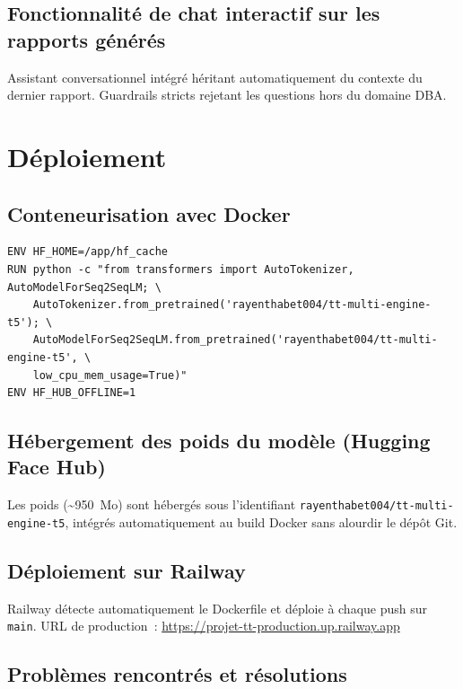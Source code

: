 \documentclass[12pt,a4paper]{report}
\begin{document}
\subsection{Fonctionnalit\'e de chat interactif sur les rapports g\'en\'er\'es}

Assistant conversationnel int\'egr\'e h\'eritant automatiquement du contexte du
dernier rapport. Guardrails stricts rejetant les questions hors du domaine DBA.

\section{D\'eploiement}

\subsection{Conteneurisation avec Docker}

\begin{lstlisting}[language={},caption={Extrait du Dockerfile --- pr\'e-t\'el\'echargement du mod\`ele},label=lst:dockerfile]
ENV HF_HOME=/app/hf_cache
RUN python -c "from transformers import AutoTokenizer, AutoModelForSeq2SeqLM; \
    AutoTokenizer.from_pretrained('rayenthabet004/tt-multi-engine-t5'); \
    AutoModelForSeq2SeqLM.from_pretrained('rayenthabet004/tt-multi-engine-t5', \
    low_cpu_mem_usage=True)"
ENV HF_HUB_OFFLINE=1
\end{lstlisting}

\subsection{H\'ebergement des poids du mod\`ele (Hugging Face Hub)}

Les poids (\textasciitilde{}950~Mo) sont h\'eberg\'es sous l'identifiant
\texttt{rayenthabet004/tt-multi-engine-t5}, int\'egr\'es automatiquement au build
Docker sans alourdir le d\'ep\^ot Git.

\subsection{D\'eploiement sur Railway}

Railway d\'etecte automatiquement le Dockerfile et d\'eploie \`a chaque push sur
\texttt{main}. URL de production~:
\url{https://projet-tt-production.up.railway.app}

\subsection{Probl\`emes rencontr\'es et r\'esolutions}
\end{document}
